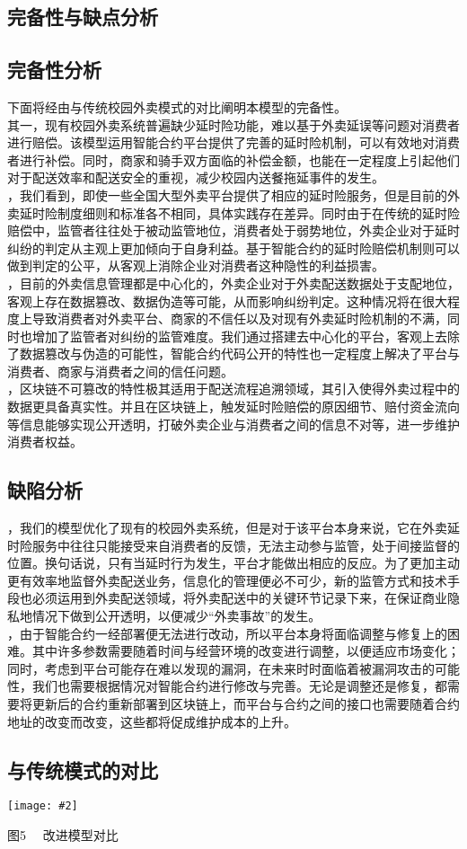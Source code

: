 \documentclass[UTF8]{ctexart}
\newcommand\picturehere[2][1]{\centerline{\texttt{[image: \#2]}}}
\newcommand\picfig[1]{\centerline{\small \heiti #1 \songti }}
\begin{document}
\begin{multicols}{2}
\section{完备性与缺点分析}
\subsection{完备性分析}
\indent 下面将经由与传统校园外卖模式的对比阐明本模型的完备性。\\
\indent 其一，现有校园外卖系统普遍缺少延时险功能，难以基于外卖延误等问题对消费者进行赔偿。该模型运用智能合约平台提供了完善的延时险机制，可以有效地对消费者进行补偿。同时，商家和骑手双方面临的补偿金额，也能在一定程度上引起他们对于配送效率和配送安全的重视，减少校园内送餐拖延事件的发生。\\
，我们看到，即使一些全国大型外卖平台提供了相应的延时险服务，但是目前的外卖延时险制度细则和标准各不相同，具体实践存在差异。同时由于在传统的延时险赔偿中，监管者往往处于被动监管地位，消费者处于弱势地位，外卖企业对于延时纠纷的判定从主观上更加倾向于自身利益。基于智能合约的延时险赔偿机制则可以做到判定的公平，从客观上消除企业对消费者这种隐性的利益损害。\\
，目前的外卖信息管理都是中心化的，外卖企业对于外卖配送数据处于支配地位，客观上存在数据篡改、数据伪造等可能，从而影响纠纷判定。这种情况将在很大程度上导致消费者对外卖平台、商家的不信任以及对现有外卖延时险机制的不满，同时也增加了监管者对纠纷的监管难度。我们通过搭建去中心化的平台，客观上去除了数据篡改与伪造的可能性，智能合约代码公开的特性也一定程度上解决了平台与消费者、商家与消费者之间的信任问题。\\
，区块链不可篡改的特性极其适用于配送流程追溯领域，其引入使得外卖过程中的数据更具备真实性。并且在区块链上，触发延时险赔偿的原因细节、赔付资金流向等信息能够实现公开透明，打破外卖企业与消费者之间的信息不对等，进一步维护消费者权益。
\subsection{缺陷分析}
，我们的模型优化了现有的校园外卖系统，但是对于该平台本身来说，它在外卖延时险服务中往往只能接受来自消费者的反馈，无法主动参与监管，处于间接监督的位置。换句话说，只有当延时行为发生，平台才能做出相应的反应。为了更加主动更有效率地监督外卖配送业务，信息化的管理便必不可少，新的监管方式和技术手段也必须运用到外卖配送领域，将外卖配送中的关键环节记录下来，在保证商业隐私地情况下做到公开透明，以便减少“外卖事故”的发生。\\
，由于智能合约一经部署便无法进行改动，所以平台本身将面临调整与修复上的困难。其中许多参数需要随着时间与经营环境的改变进行调整，以便适应市场变化；同时，考虑到平台可能存在难以发现的漏洞，在未来时时面临着被漏洞攻击的可能性，我们也需要根据情况对智能合约进行修改与完善。无论是调整还是修复，都需要将更新后的合约重新部署到区块链上，而平台与合约之间的接口也需要随着合约地址的改变而改变，这些都将促成维护成本的上升。
\subsection{与传统模式的对比}
\picturehere[0.55]{image/advance.png}
\picfig{图5  \ \  改进模型对比}


\end{multicols}

\renewcommand{\refname}{参考文献}


\end{document}
